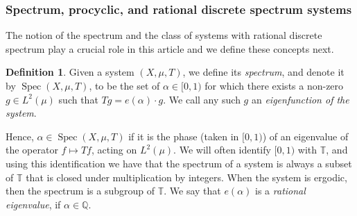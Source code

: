 \documentclass[11pt]{amsart}
\theoremstyle{definition}
\newtheorem{definition}{Definition}[section]
\newcommand{\N}{{\mathbb N}}
\newcommand{\Q}{{\mathbb Q}}
\newcommand{\T}{{\mathbb T}}
\newcommand{\U}{{\mathbb U}}
\DeclareMathOperator{\spec}{Spec}
\begin{document}
\subsubsection*{Spectrum, procyclic,  and rational discrete spectrum systems}
The notion of the spectrum and the class of systems with rational discrete spectrum play a crucial role in this article and we define these concepts next.
\begin{definition}\label{D:Spectrum}
Given a system $(X,\mu,T)$, we define its {\em spectrum}, and denote it by   $\spec(X,\mu,T)$, to be the set of
$\alpha\in [0,1)$ for which there exists a non-zero $g\in L^2(\mu)$ such that  $Tg=e(\alpha) \cdot g$.
We call any such $g$ an  {\em eigenfunction of the system}.

\end{definition}
Hence, $\alpha\in \spec(X,\mu,T)$ if it is the phase (taken in $[0,1)$) of an eigenvalue of the operator $f\mapsto Tf$, acting on $L^2(\mu)$.
We will often identify $[0,1)$ with $\T$, and using  this identification we have that the spectrum of a system is always a subset of $\T$ that is closed under multiplication by integers.
When the system is ergodic, then the spectrum is a subgroup of $\T$.
We say that $e(\alpha)$ is a {\em rational eigenvalue}, if $\alpha\in \Q$.
\end{document}
